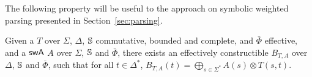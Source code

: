       
      
      
\noindent
The following property will be useful to the approach on 
symbolic weighted parsing presented in Section~\ref{sec:parsing}.

\begin{proposition} \label{prop:epsilon}
Given a \SWT $T$ over $\Sigma$, $\Delta$, 
$\mathbb{S}$ commutative, bounded and complete,
and $\bar\Phi$ effective,
and a $\textsf{swA}$ $A$ over $\Sigma$, $\mathbb{S}$ and $\bar\Phi$,
there exists an effectively constructible \SWA 
$B_{T, A}$ over $\Delta$, $\mathbb{S}$ and $\bar\Phi$,
such that for all $t \in \Delta^*$, 
$B_{T, A}(t) = \displaystyle\bigoplus_{s\in \Sigma^*} A(s) \otimes T(s, t)$.
\end{proposition}
%
